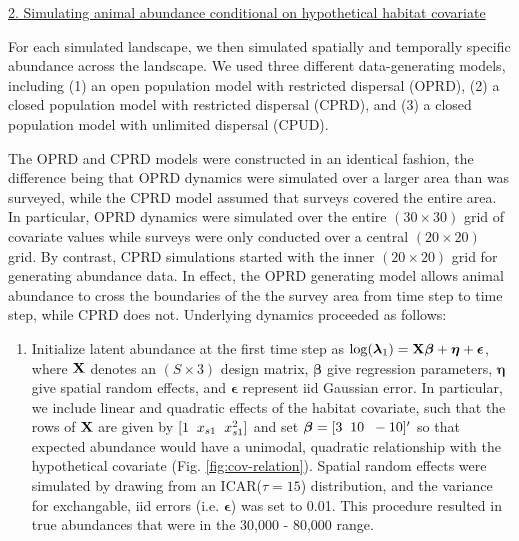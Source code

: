 \documentclass[12pt,fleqn]{article}
\begin{document}
\begin{flushleft}
\underline{2. Simulating animal abundance conditional on hypothetical habitat covariate}

For each simulated landscape, we then simulated spatially and temporally specific abundance across the landscape.  We used three different data-generating models, including (1) an open population model with restricted dispersal (OPRD), (2) a closed population model with restricted dispersal (CPRD), and (3) a closed population model with unlimited dispersal (CPUD).

\hspace{.5in} The OPRD and CPRD models were constructed in an identical fashion, the difference being that OPRD dynamics were simulated over a larger area than was surveyed, while the CPRD model assumed that surveys covered the entire area.  In particular, OPRD dynamics were simulated over the entire $(30 \times 30)$ grid of covariate values while surveys were only conducted over a central $(20 \times 20)$ grid.  By contrast, CPRD simulations started with the inner $(20 \times 20)$ grid for generating abundance data.  In effect, the OPRD generating model allows animal abundance to cross the boundaries of the the survey area from time step to time step, while CPRD does not.  Underlying dynamics proceeded as follows:
\begin{enumerate}
\renewcommand{\theenumi}{\Alph{enumi}} %
  \item Initialize latent abundance at the first time step as
   $\log(\boldsymbol{\lambda}_1) = {\bf X} \boldsymbol{\beta} + \boldsymbol{\eta} + \boldsymbol{\epsilon}$,
   where ${\bf X}$ denotes an $(S \times 3)$ design matrix, $\boldsymbol{\beta}$ give regression parameters, $\boldsymbol{\eta}$ give spatial random effects, and $\boldsymbol{\epsilon}$ represent iid Gaussian error.  In particular, we include linear and quadratic effects of the habitat covariate, such that the rows of ${\bf X}$ are given by $[1 \hspace{2mm} x_{s1} \hspace{2mm} x_{s1}^2]$ and set $\boldsymbol{\beta} = [3 \hspace{2mm} 10 \hspace{2mm} -10]^\prime$ so that expected abundance would have a unimodal, quadratic relationship with the hypothetical covariate (Fig. \ref{fig:cov-relation}).  Spatial random effects were simulated by drawing from an ICAR($\tau=15$) distribution, and the variance for exchangable, iid errors (i.e. $\boldsymbol{\epsilon}$) was set to 0.01. This procedure resulted in true abundances that were in the 30,000 - 80,000 range.\\

\end{enumerate}
\end{flushleft}
\end{document}
